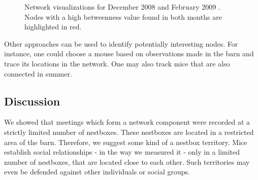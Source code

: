 \begin{figure}[htpb]%
	\centering 
	
	\qquad 			
	\caption[Network visualizations for December 2008 and February 2009 ]{Network visualizations for December 2008  and February 2009 . Nodes with a high betweenness value found in both months are highlighted in red.}
	 \label{fig:pi_nodes_dec_feb}
\end{figure} 

\pagebreak

Other approaches can be used to identify potentially interesting nodes. For instance, one could choose a mouse based on observations made in the barn and trace its locations in the network. One may also track mice that are also connected in summer.

\subsection{Discussion}
\label{subsec:discussion}

We showed that meetings which form a network component were recorded at a strictly limited number of nestboxes. These nestboxes are located in a restricted area of the barn. Therefore, we suggest some kind of a nestbox territory. Mice establish social relationships - in the way we measured it - only in a limited number of nestboxes, that are located close to each other. Such territories may even be defended against other individuals or social groups.

